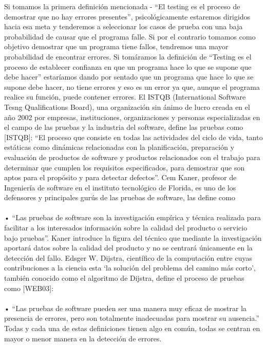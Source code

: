 \documentclass[12pt,letterpaper]{article}
\begin{document}
    Si tomamos la primera definición mencionada - “El testing es el proceso de demostrar que no hay errores presentes”, psicológicamente estaremos dirigidos hacia esa meta y tenderemos a seleccionar los casos de prueba con una baja probabilidad de causar que el programa falle. Si por el contrario tomamos como objetivo demostrar que un programa tiene fallos, tendremos una mayor probabilidad de encontrar errores.
    Si tomáramos la definición de “Testing es el proceso de establecer confianza en que un programa hace lo que se supone que debe hacer” estaríamos dando por sentado que un programa que hace lo que se supone debe hacer, no tiene errores y eso es un error ya que, aunque el programa realice su función, puede contener errores.
    El ISTQB (International Software Tesng Qualifications Board), una organización sin ánimo de lucro creada en el año 2002 por empresas, instituciones, organizaciones y personas especializadas en el campo de las pruebas y la industria del software, define las pruebas como [ISTQB]:
    “El proceso que consiste en todas las actividades del ciclo de vida, tanto estáticas como dinámicas relacionadas con la planificación, preparación y evaluación de productos de software y productos relacionados con el trabajo para determinar que cumplen los requisitos especificados, para demostrar que son aptos para el propósito y para detectar defectos”.
    Cem Kaner, profesor de Ingeniería de software en el instituto tecnológico de Florida, es uno de los defensores y principales gurús de las pruebas de software, las define como 
    \\
    \\
    •	“Las pruebas de software son la investigación empírica y técnica realizada para facilitar a los interesados información sobre la calidad del producto o servicio bajo pruebas”.
    Kaner introduce la figura del técnico que mediante la investigación aportará datos sobre la calidad del producto y no se centrará únicamente en la detección del fallo.
    Edsger W. Dijstra, científico de la computación entre cuyas contribuciones a la ciencia esta ‘la solución del problema del camino más corto’, también conocido como el algoritmo de Dijstra, define el proceso de pruebas como [WEB03]:
    \\
    \\
    •	“Las pruebas de software pueden ser una manera muy eficaz de mostrar la presencia de errores, pero son totalmente inadecuadas  para mostrar su ausencia.”
    Todas y cada una de estas definiciones tienen algo en común, todas se centran en mayor o menor manera en la detección de errores.
\end{document}
